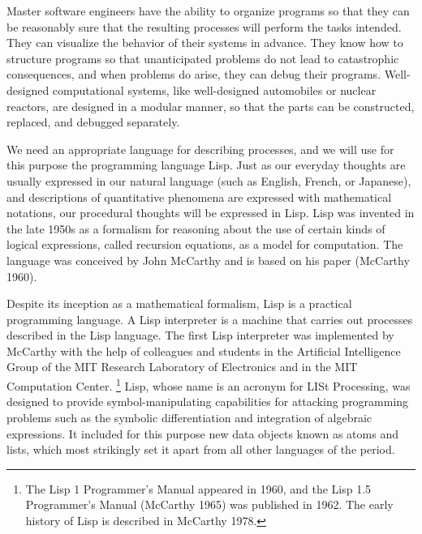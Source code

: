 Master software engineers have the ability to organize programs
so that they can be reasonably sure that the resulting processes will perform the tasks intended.
They can visualize the behavior of their systems in advance.
They know how to structure programs so that unanticipated problems do not lead to catastrophic consequences,
and when problems do arise, they can debug their programs.
Well-designed computational systems, like well-designed automobiles or nuclear reactors,
are designed in a modular manner, so that the parts can be constructed, replaced, and debugged separately.

\subject{Programming in Lisp}

We need an appropriate language for describing processes,
and we will use for this purpose the programming language Lisp.
Just as our everyday thoughts are usually expressed in our natural language (such as English, French, or Japanese),
and descriptions of quantitative phenomena are expressed with mathematical notations,
our procedural thoughts will be expressed in Lisp.
Lisp was invented in the late 1950s as a formalism for reasoning about the use of certain kinds of logical expressions,
called recursion equations, as a model for computation.
The language was conceived by John McCarthy and is based on his paper
 (McCarthy 1960).

Despite its inception as a mathematical formalism, Lisp is a practical programming language.
A Lisp interpreter is a machine that carries out processes described in the Lisp language.
The first Lisp interpreter was implemented by
McCarthy with the help of colleagues
and students in the Artificial Intelligence Group of the MIT Research Laboratory of Electronics
and in the MIT Computation Center.
\footnote{%
   The Lisp 1 Programmer's Manual appeared in 1960,
   and the Lisp 1.5 Programmer's Manual (McCarthy 1965) was published in 1962.
   The early history of Lisp is described in McCarthy 1978.
}
Lisp, whose name is an acronym for LISt Processing,
was designed to provide symbol-manipulating capabilities for attacking programming problems
such as the symbolic differentiation and integration of algebraic expressions.
It included for this purpose new data objects known as atoms and lists,
which most strikingly set it apart from all other languages of the period.

